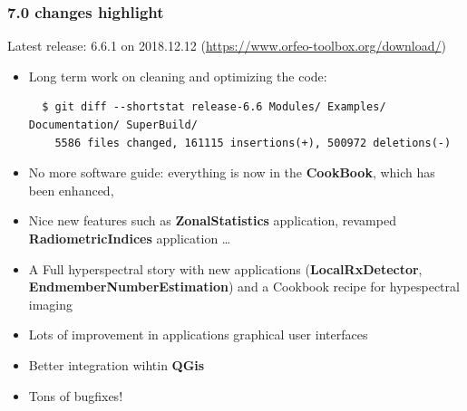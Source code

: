 \documentclass[8pt,aspectratio=169]{beamer}
\begin{document}
    \begin{frame}[fragile]
    \frametitle{7.0 changes highlight}
    \begin{center}
      Latest release: 6.6.1 on 2018.12.12 (\small{\url{https://www.orfeo-toolbox.org/download/}})\\
      \vspace{0.1cm}
      \color{red}{7.0.0 release schedule: 2019.06}
    \end{center}
    \begin{itemize}
    \item Long term work on cleaning and optimizing the code:
      \begin{small}
      \begin{verbatim}
  $ git diff --shortstat release-6.6 Modules/ Examples/ Documentation/ SuperBuild/
    5586 files changed, 161115 insertions(+), 500972 deletions(-)
      \end{verbatim}
      \end{small}
    \item No more software guide: everything is now in the \textbf{CookBook}, which has been enhanced,
    \item Nice new features such as \textbf{ZonalStatistics} application, revamped \textbf{RadiometricIndices} application \ldots
    \item A Full hyperspectral story with new applications (\textbf{LocalRxDetector}, \textbf{EndmemberNumberEstimation}) and a Cookbook recipe for hypespectral imaging
    \item Lots of improvement in applications graphical user interfaces
    \item Better integration wihtin \textbf{QGis}
    \item Tons of bugfixes!
      
    \end{itemize}

    \end{frame}
\end{document}

